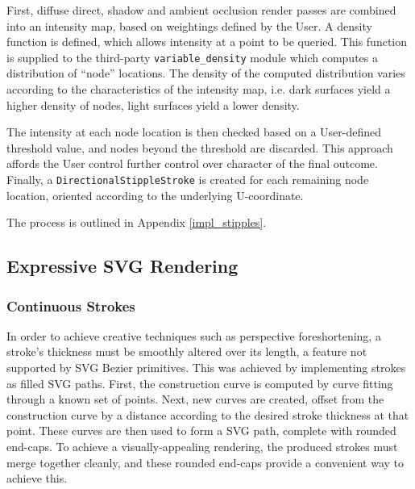 {First, diffuse direct, shadow and ambient occlusion render passes are combined into an intensity map, based on weightings defined by the User.
A density function is defined, which allows intensity at a point to be queried.
This function is supplied to the third-party \texttt{variable\_density} module which computes a distribution of ``node'' locations.
The density of the computed distribution varies according to the characteristics of the intensity map, i.e. dark surfaces yield a higher density of nodes, light surfaces yield a lower density.

The intensity at each node location is then checked based on a User-defined threshold value, and nodes beyond the threshold are discarded.
This approach affords the User control further control over character of the final outcome.
Finally, a \texttt{DirectionalStippleStroke} is created for each remaining node location, oriented according to the underlying U-coordinate.

The process is outlined in Appendix \ref{impl_stipples}.

\subsection{Expressive SVG Rendering}

\FloatBarrier
\subsubsection{Continuous Strokes}

In order to achieve creative techniques such as perspective foreshortening, a stroke’s thickness must be smoothly altered over its length, a feature not supported by SVG Bezier primitives. 
This was achieved by implementing strokes as filled SVG paths.
First, the construction curve is computed by curve fitting through a known set of points.
Next, new curves are created, offset from the construction curve by a distance according to the desired stroke thickness at that point.
These curves are then used to form a SVG path, complete with rounded end-caps.
To achieve a visually-appealing rendering, the produced strokes must merge together cleanly, and these rounded end-caps provide a convenient way to achieve this.

}
